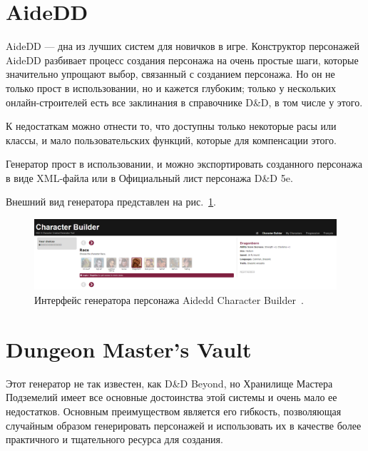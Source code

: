 \section{AideDD}

AideDD --- дна из лучших систем для новичков в игре. Конструктор персонажей AideDD разбивает процесс создания персонажа на очень простые шаги, которые значительно упрощают выбор, связанный с созданием персонажа. Но он не только прост в использовании, но и кажется глубоким; только у нескольких онлайн-строителей есть все заклинания в справочнике D\&D, в том числе у этого.

К недостаткам можно отнести то, что доступны только некоторые расы или классы, и мало пользовательских функций, которые для компенсации этого.

Генератор прост в использовании, и можно экспортировать созданного персонажа в виде XML-файла или в Официальный лист персонажа D\&D 5e.

Внешний вид генератора представлен на рис.~\ref{fig:aidedd}.

\begin{figure}[H]
    \centering
    \includegraphics[scale=0.3]{Aidedd.png}
    \caption{Интерфейс генератора персонажа Aidedd Character Builder~\cite{aidedd}.}
    \label{fig:aidedd}
\end{figure}

\section{Dungeon Master’s Vault}

Этот генератор не так известен, как D\&D Beyond, но Хранилище Мастера Подземелий имеет все основные достоинства этой системы и очень мало ее недостатков. Основным преимуществом является его гибкость, позволяющая случайным образом генерировать персонажей и использовать их в качестве более практичного и тщательного ресурса для создания.

